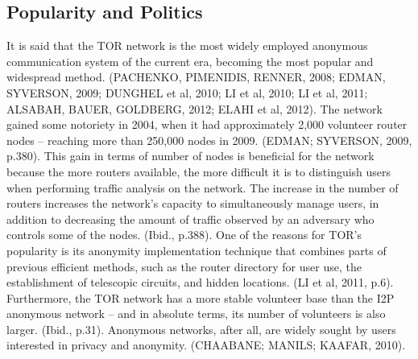 \subsection{Popularity and Politics}

It is said that the TOR network is the most widely employed anonymous communication system of the current era, becoming the most popular and widespread method. (PACHENKO, PIMENIDIS, RENNER, 2008; EDMAN, SYVERSON, 2009; DUNGHEL et al, 2010; LI et al, 2010; LI et al, 2011; ALSABAH, BAUER, GOLDBERG, 2012; ELAHI et al, 2012). The network gained some notoriety in 2004, when it had approximately 2,000 volunteer router nodes -- reaching more than 250,000 nodes in 2009. (EDMAN; SYVERSON, 2009, p.380). This gain in terms of number of nodes is beneficial for the network because the more routers available, the more difficult it is to distinguish users when performing traffic analysis on the network. The increase in the number of routers increases the network's capacity to simultaneously manage users, in addition to decreasing the amount of traffic observed by an adversary who controls some of the nodes. (Ibid., p.388). One of the reasons for TOR's popularity is its anonymity implementation technique that combines parts of previous efficient methods, such as the router directory for user use, the establishment of telescopic circuits, and hidden locations. (LI et al, 2011, p.6). Furthermore, the TOR network has a more stable volunteer base than the I2P anonymous network -- and in absolute terms, its number of volunteers is also larger. (Ibid., p.31). Anonymous networks, after all, are widely sought by users interested in privacy and anonymity. (CHAABANE; MANILS; KAAFAR, 2010).

